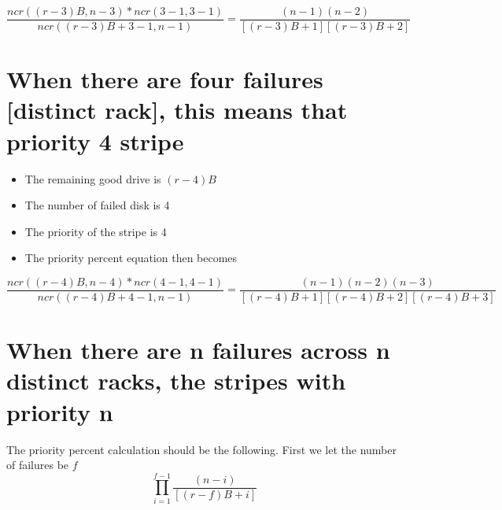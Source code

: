 \documentclass[journal]{IEEEtran}
\begin{document}
\begin{equation*}
  \frac{ncr((r-3)B, n-3)*ncr(3-1, 3-1)}{ncr((r-3)B+3-1, n-1)}=\frac{(n-1)(n-2)}{[(r-3)B+1][(r-3)B+2]}
\end{equation*}

\section{When there are four failures [distinct rack], this means that \textbf{priority 4 stripe} }
\begin{itemize}
  \item The remaining good drive is $(r-4)B$
  \item The number of failed disk is 4
  \item The priority of the stripe is 4
  \item The priority percent equation then becomes
\end{itemize}

\begin{equation*}
  \frac{ncr((r-4)B, n-4)*ncr(4-1, 4-1)}{ncr((r-4)B+4-1, n-1)}=\frac{(n-1)(n-2)(n-3)}{[(r-4)B+1][(r-4)B+2][(r-4)B+3]}
\end{equation*}

\section{When there are n failures across n distinct racks, the stripes with priority n}

The priority percent calculation should be the following. First we let the number of failures be $f$
\begin{equation*}
  \prod_{i=1}^{f-1}\frac{(n-i)}{[(r-f)B+i]}
\end{equation*}

\newpage
\singlespacing 
\end{document}
